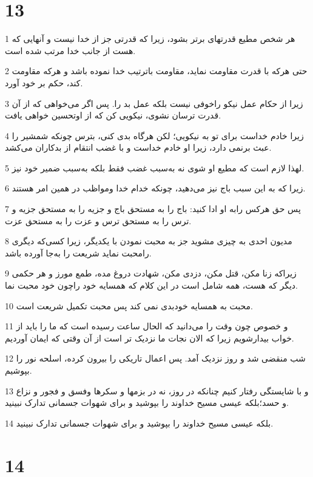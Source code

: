 \chapter{13}

\par 1 هر شخص مطیع قدرتهای برتر بشود، زیرا که قدرتی جز از خدا نیست و آنهایی که هست از جانب خدا مرتب شده است.
\par 2 حتی هر‌که با قدرت مقاومت نماید، مقاومت باترتیب خدا نموده باشد و هر‌که مقاومت کند، حکم بر خود آورد.
\par 3 زیرا از حکام عمل نیکو راخوفی نیست بلکه عمل بد را. پس اگر می‌خواهی که از آن قدرت ترسان نشوی، نیکویی کن که از اوتحسین خواهی یافت.
\par 4 زیرا خادم خداست برای تو به نیکویی؛ لکن هرگاه بدی کنی، بترس چونکه شمشیر را عبث برنمی دارد، زیرا او خادم خداست و با غضب انتقام از بدکاران می‌کشد.
\par 5 لهذا لازم است که مطیع او شوی نه به‌سبب غضب فقط بلکه به‌سبب ضمیر خود نیز.
\par 6 زیرا که به این سبب باج نیز می‌دهید، چونکه خدام خدا ومواظب در همین امر هستند.
\par 7 پس حق هرکس رابه او ادا کنید: باج را به مستحق باج و جزیه را به مستحق جزیه و ترس را به مستحق ترس و عزت را به مستحق عزت.
\par 8 مدیون احدی به چیزی مشوید جز به محبت نمودن با یکدیگر، زیرا کسی‌که دیگری رامحبت نماید شریعت را به‌جا آورده باشد.
\par 9 زیراکه زنا مکن، قتل مکن، دزدی مکن، شهادت دروغ مده، طمع مورز و هر حکمی دیگر که هست، همه شامل است در این کلام که همسایه خود راچون خود محبت نما.
\par 10 محبت به همسایه خودبدی نمی کند پس محبت تکمیل شریعت است.
\par 11 و خصوص چون وقت را می‌دانید که الحال ساعت رسیده است که ما را باید از خواب بیدارشویم زیرا که الان نجات ما نزدیک تر است از آن وقتی که ایمان آوردیم.
\par 12 شب منقضی شد و روز نزدیک آمد. پس اعمال تاریکی را بیرون کرده، اسلحه نور را بپوشیم.
\par 13 و با شایستگی رفتار کنیم چنانکه در روز، نه در بزمها و سکرها وفسق و فجور و نزاع و حسد؛بلکه عیسی مسیح خداوند را بپوشید و برای شهوات جسمانی تدارک نبینید.
\par 14 بلکه عیسی مسیح خداوند را بپوشید و برای شهوات جسمانی تدارک نبینید.

\chapter{14}


